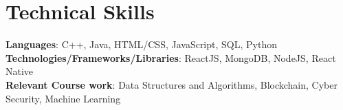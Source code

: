 \documentclass[letterpaper,11pt]{article}
\begin{document}
%
\section{Technical Skills}
 \begin{itemize}[leftmargin=0.15in, label={}]
	\small{\item{
 	\textbf{Languages}{: C++, Java, HTML/CSS, JavaScript, SQL, Python} \\
 	\textbf{Technologies/Frameworks/Libraries}{: ReactJS, MongoDB, NodeJS, React Native} \\
        \textbf{Relevant Course work}{: Data Structures and Algorithms, Blockchain, Cyber Security, Machine Learning}
  \\
	}}
 \end{itemize}
 \vspace{-16pt}
\end{document}
